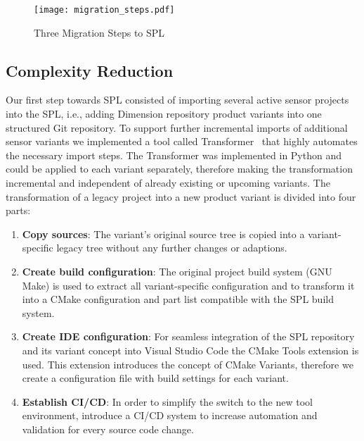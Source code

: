 \begin{figure*}[ht]
  \centering
  \texttt{[image: migration\_steps.pdf]}
  \caption{Three Migration Steps to SPL}
  \label{fig:threeMigrationSteps}
\end{figure*}

\subsection{Complexity Reduction}\label{complexity}

Our first step towards SPL consisted of importing several active sensor projects into
the SPL, i.e., adding Dimension repository product variants into one structured Git
repository. To support further incremental imports of additional sensor variants
we implemented a tool called Transformer~\cite{GithubTransformer} that highly
automates the necessary import steps. The Transformer was implemented in Python
and could be applied to each variant separately, therefore making the transformation
incremental and independent of already existing or upcoming variants. The transformation
of a legacy project into a new product variant is divided into four parts:

\begin{enumerate}
  \item \textbf{Copy sources}: The variant's original source tree is copied
        into a variant-specific legacy tree without any further changes or
        adaptions.
  \item \textbf{Create build configuration}: The original project build
        system (GNU Make) is used to extract all variant-specific configuration and
        to transform it into a CMake configuration and part list compatible with
        the SPL build system.
  \item \textbf{Create IDE configuration}: For seamless integration of the SPL
        repository and its variant concept into Visual Studio Code the
        CMake Tools extension is used. This extension introduces the concept of CMake
        Variants, therefore we create a configuration file with build settings
        for each variant.
  \item \textbf{Establish CI/CD}: In order to simplify the switch to the new
        tool environment, introduce a CI/CD system to increase automation and
        validation for every source code change.
\end{enumerate}

